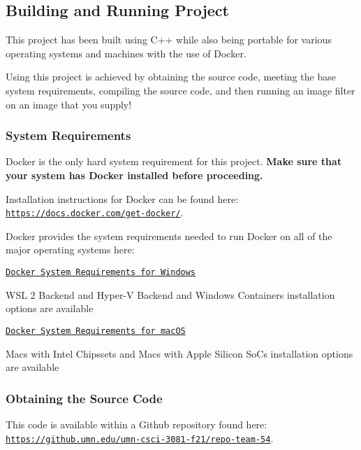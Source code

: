 \subsection*{Building and Running Project}

This project has been built using C++ while also being portable for various operating systems and machines with the use of Docker.

Using this project is achieved by obtaining the source code, meeting the base system requirements, compiling the source code, and then running an image filter on an image that you supply!

\subsubsection*{System Requirements}

Docker is the only hard system requirement for this project. {\bfseries Make sure that your system has Docker installed before proceeding.}

Installation instructions for Docker can be found here\+: \href{https://docs.docker.com/get-docker/}{\tt https\+://docs.\+docker.\+com/get-\/docker/}.

Docker provides the system requirements needed to run Docker on all of the major operating systems here\+:
\begin{DoxyItemize}
\item \href{https://docs.docker.com/desktop/windows/install/}{\tt Docker System Requirements for Windows}
\begin{DoxyItemize}
\item W\+SL 2 Backend and Hyper-\/V Backend and Windows Containers installation options are available
\end{DoxyItemize}
\item \href{https://docs.docker.com/desktop/mac/install/#system-requirements}{\tt Docker System Requirements for mac\+OS}
\begin{DoxyItemize}
\item Macs with Intel Chipssets and Macs with Apple Silicon So\+Cs installation options are available
\end{DoxyItemize}
\end{DoxyItemize}

\subsubsection*{Obtaining the Source Code}

This code is available within a Github repository found here\+: \href{https://github.umn.edu/umn-csci-3081-f21/repo-team-54}{\tt https\+://github.\+umn.\+edu/umn-\/csci-\/3081-\/f21/repo-\/team-\/54}.

